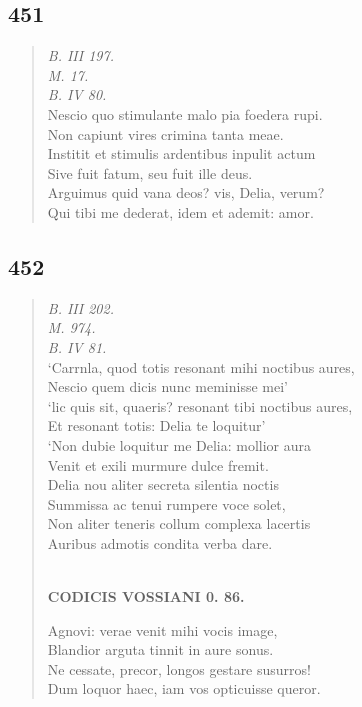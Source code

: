 \documentclass[11pt, a4paper]{report}
\begin{document}
            \subsection*{451}
      \begin{verse}
      \textit{B. III 197.} \\ \textit{M. 17.} \\ \textit{B. IV 80.} \\ Nescio quo stimulante malo pia foedera rupi. \\ Non capiunt vires crimina tanta meae. \\ Institit et stimulis ardentibus inpulit actum \\ Sive fuit fatum, seu fuit ille deus. \\ Arguimus quid vana deos? vis, Delia, verum? \\ Qui tibi me dederat, idem et ademit: amor. \\ 
      \end{verse}
  
            \subsection*{452}
      \begin{verse}
      \textit{B. III 202.} \\ \textit{M. 974.} \\ \textit{B. IV 81.} \\ ‘Carrnla, quod totis resonant mihi noctibus aures, \\ Nescio quem dicis nunc meminisse mei’ \\ ‘lic quis sit, quaeris? resonant tibi noctibus aures, \\ Et resonant totis: Delia te loquitur’ \\ ‘Non dubie loquitur me Delia: mollior aura \\ Venit et exili murmure dulce fremit. \\ Delia nou aliter secreta silentia noctis \\ Summissa ac tenui rumpere voce solet, \\ Non aliter teneris collum complexa lacertis \\ Auribus admotis condita verba dare. \\ 
        ﻿\pagebreak 
    \begin{center} \textbf{CODICIS VOSSIANI 0. 86.} \end{center} \marginpar{[337]} Agnovi: verae venit mihi vocis image, \\ Blandior arguta tinnit in aure sonus. \\ Ne cessate, precor, longos gestare susurros! \\ Dum loquor haec, iam vos opticuisse queror. \\ 
      \end{verse}
  
\end{document}

